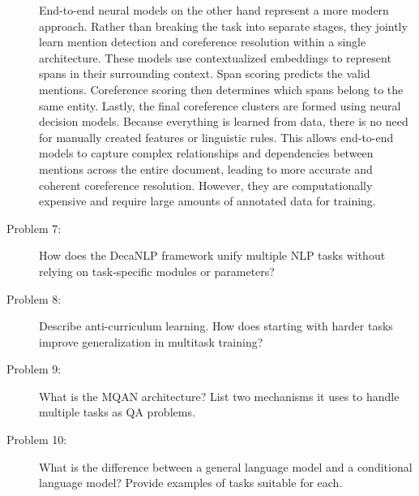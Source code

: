 \documentclass[10pt]{article}
\begin{document}
\begin{description}
End-to-end neural models on the other hand represent a more modern approach. Rather than breaking the task into separate stages, 
they jointly learn mention detection and coreference resolution within a single architecture. These models use contextualized embeddings 
to represent spans in their surrounding context. Span scoring predicts the valid mentions. Coreference scoring then determines which spans
belong to the same entity. Lastly, the final coreference clusters are formed using neural decision models. 
Because everything is learned from data, there is no need for manually created features or linguistic rules.
This allows end-to-end models to capture complex relationships and dependencies between mentions across the entire document, 
leading to more accurate and coherent coreference resolution. However, they are computationally expensive and require large amounts of annotated data for training.

\pagebreak

\item[Problem 7:] How does the DecaNLP framework unify multiple NLP tasks without relying on task-specific modules or parameters?

\pagebreak

\item[Problem 8:] Describe anti-curriculum learning. How does starting with harder tasks improve generalization in multitask training?

\pagebreak

\item[Problem 9:] What is the MQAN architecture? List two mechanisms it uses to handle multiple tasks as QA problems.

\pagebreak

\item[Problem 10:] What is the difference between a general language model and a conditional language model? Provide examples of tasks suitable for each.

\end{description}
\end{document}
